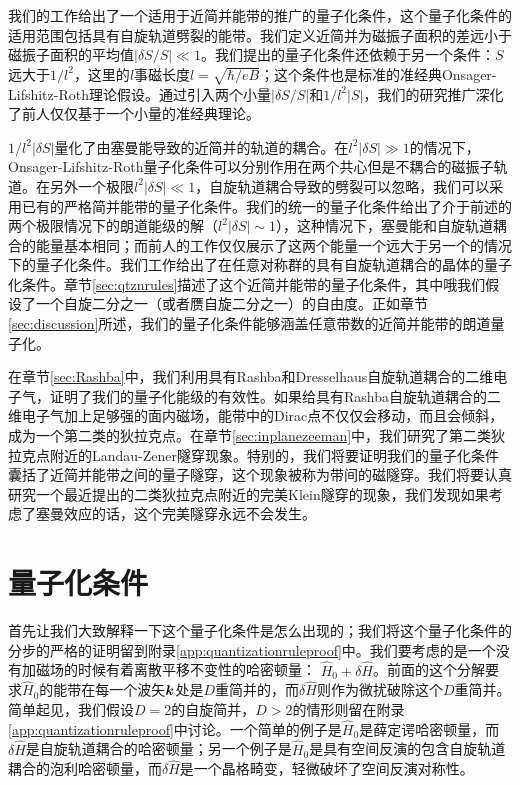 我们的工作给出了一个适用于近简并能带的推广的量子化条件，这个量子化条件的适用范围包括具有自旋轨道劈裂的能带。我们定义近简并为磁振子面积的差远小于磁振子面积的平均值$|\delta S/S|{\ll}1$。我们提出的量子化条件还依赖于另一个条件：$S$远大于$1/l^2$，这里的$l$事磁长度$l{=}\sqrt{\hbar/eB}$；这个条件也是标准的准经典Onsager-Lifshitz-Roth理论假设。通过引入两个小量$|\delta S/S|$和$1/l^2|S|$，我们的研究推广深化了前人仅仅基于一个小量的准经典理论\cite{kohn_effham,blount_effham,rotheffham,wannier_fredkin,fischbeck_review,Mikitik_quantizationrule,topoferm,100p,gao_zero-field_2017}。

$1/l^2|\delta S|$量化了由塞曼能导致的近简并的轨道的耦合。在$l^2|\delta S|{\gg}1$的情况下，Onsager-Lifshitz{-Roth}量子化条件可以分别作用在两个共心但是不耦合的磁振子轨道。在另外一个极限$l^2|\delta S|{\ll}1$，自旋轨道耦合导致的劈裂可以忽略，我们可以采用已有的严格简并能带的量子化条件\cite{rotheffham,rothmag,topoferm,100p,Mikitik_quantizationrule}。我们的统一的量子化条件给出了介于前述的两个极限情况下的朗道能级的解（$l^2|\delta S|{\sim}1$），这种情况下，塞曼能和自旋轨道耦合的能量基本相同；而前人的工作仅仅展示了这两个能量一个远大于另一个的情况下的量子化条件。我们工作给出了在任意对称群的具有自旋轨道耦合的晶体的量子化条件。章节\ref{sec:qtznrules}描述了这个近简并能带的量子化条件，其中哦我们假设了一个自旋二分之一（或者赝自旋二分之一）的自由度。正如章节\ref{sec:discussion}所述，我们的量子化条件能够涵盖任意带数的近简并能带的朗道量子化。


在章节\ref{sec:Rashba}中，我们利用具有Rashba和Dresselhaus自旋轨道耦合的二维电子气，证明了我们的量子化能级的有效性。如果给具有Rashba自旋轨道耦合的二维电子气加上足够强的面内磁场，能带中的Dirac点不仅仅会移动，而且会倾斜，成为一个第二类的狄拉克点\cite{soluyanov_type-ii_2015, muechler_tilted_2016, bergholtz_topology_2015}。在章节\ref{sec:inplanezeeman}中，我们研究了第二类狄拉克点附近的Landau-Zener隧穿现象。特别的，我们将要证明我们的量子化条件囊括了近简并能带之间的量子隧穿，这个现象被称为带间的磁隧穿\cite{kaganov_coherent_1983,slutskin_dynamics_1968,AALG,100p}。我们将要认真研究一个最近提出的二类狄拉克点附近的完美Klein隧穿的现象\cite{obrien_magnetic_2016}，我们发现如果考虑了塞曼效应的话，这个完美隧穿永远不会发生。


\section{量子化条件\label{sec:qtznrules}}

首先让我们大致解释一下这个量子化条件是怎么出现的；我们将这个量子化条件的分步的严格的证明留到附录\ref{app:quantizationruleproof}中。我们要考虑的是一个没有加磁场的时候有着离散平移不变性的哈密顿量： $\hat{H}_0{+}\delta \hat{H}$。前面的这个分解要求$\hat{H}_0$的能带在每一个波矢$\boldsymbol{k}$处是$D$重简并的，而$\delta \hat{H}$则作为微扰破除这个$D$重简并。简单起见，我们假设$D{=}2$的自旋简并，$D>2$的情形则留在附录\ref{app:quantizationruleproof}中讨论。一个简单的例子是$\hat{H}_0$是薛定谔哈密顿量，而$\delta \hat{H}$是自旋轨道耦合的哈密顿量；另一个例子是$\hat{H}_0$是具有空间反演的包含自旋轨道耦合的泡利哈密顿量，而$\delta \hat{H}$是一个晶格畸变，轻微破坏了空间反演对称性。

